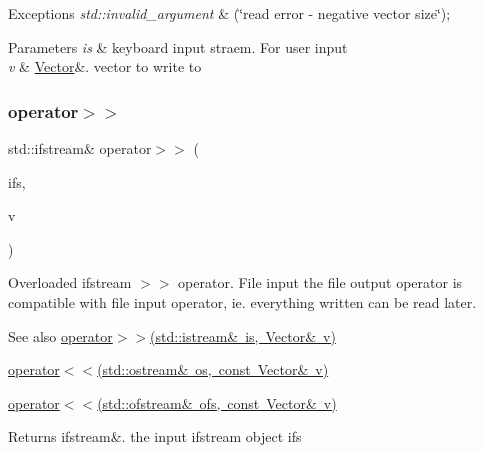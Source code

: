 \begin{DoxyExceptions}{Exceptions}
{\em std\+::invalid\+\_\+argument} & (\char`\"{}read error -\/ negative vector size\char`\"{}); \\
\hline
\end{DoxyExceptions}

\begin{DoxyParams}{Parameters}
{\em is} & keyboard input straem. For user input \\
\hline
{\em v} & \mbox{\hyperlink{class_vector}{Vector}}\&. vector to write to \\
\hline
\end{DoxyParams}
\mbox{\label{class_vector_ab6009b37fac65598b3db164dc4f19fed}} 
\subsubsection{\texorpdfstring{operator$>$$>$}{operator>>}\hspace{0.1cm}{\footnotesize\ttfamily [2/2]}}
{\footnotesize\ttfamily std\+::ifstream\& operator$>$$>$ (\begin{DoxyParamCaption}\item[{std\+::ifstream \&}]{ifs,  }\item[{\mbox{\hyperlink{class_vector}{Vector}} \&}]{v }\end{DoxyParamCaption})\hspace{0.3cm}{\ttfamily [friend]}}

Overloaded ifstream $>$$>$ operator. File input the file output operator is compatible with file input operator, ie. everything written can be read later. \begin{DoxySeeAlso}{See also}
\mbox{\hyperlink{class_vector_ac198cff0f4196c66649278458eebf227}{operator$>$$>$(std\+::istream\& is, Vector\& v)}} 

\mbox{\hyperlink{class_vector_ac254b27efeb8486ee2f67821e3a21a60}{operator$<$$<$(std\+::ostream\& os, const Vector\& v)}} 

\mbox{\hyperlink{class_vector_a8e755f5550c983df730602890058d990}{operator$<$$<$(std\+::ofstream\& ofs, const Vector\& v)}} 
\end{DoxySeeAlso}
\begin{DoxyReturn}{Returns}
ifstream\&. the input ifstream object ifs 
\end{DoxyReturn}

